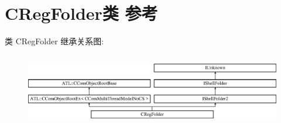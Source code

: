 \hypertarget{class_c_reg_folder}{}\section{C\+Reg\+Folder类 参考}
\label{class_c_reg_folder}
类 C\+Reg\+Folder 继承关系图\+:\begin{figure}[H]
\begin{center}
\leavevmode
\includegraphics[height=3.181818cm]{class_c_reg_folder}
\end{center}
\end{figure}
